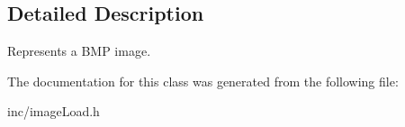 \subsection{Detailed Description}
Represents a B\-M\-P image. 

The documentation for this class was generated from the following file\-:\begin{DoxyCompactItemize}
\item 
inc/image\-Load.\-h\end{DoxyCompactItemize}
